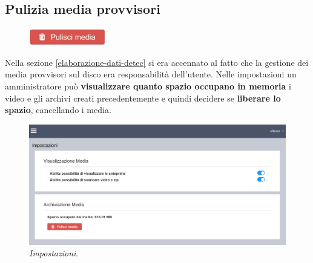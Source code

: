 \subsection{Pulizia media provvisori} \label{clean-media}

\begin{figure}
    \vspace{-10pt}
    \includegraphics[width=0.3\textwidth]{images/clean-media-button.jpg}
    \vspace{-24pt}
\end{figure}
Nella sezione \ref{elaborazione-dati-detec} si era accennato al fatto che la gestione dei media provvisori sul disco era responsabilità dell'utente.
Nelle impostazioni un amministratore può \textbf{visualizzare quanto spazio occupano in memoria} i video e gli archivi creati precedentemente e quindi decidere se \textbf{liberare lo spazio}, cancellando i media.  

\begin{figure}[H]
    \begin{center}
    \includegraphics[width=\textwidth]{images/full-settings.png}
    \caption{\emph{Impostazioni}.}
    \label{fig:settings}
    \end{center}
\end{figure}